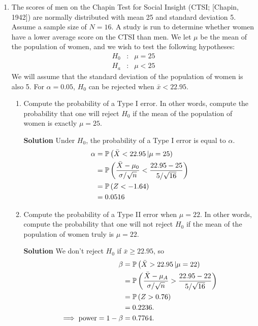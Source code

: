 \begin{enumerate}
    \item The scores of men on the Chapin Test for Social Insight (CTSI; [Chapin, 1942]) are normally distributed with mean 25 and standard deviation 5. Assume a sample size of $N = 16$. A study is run to determine whether women have a lower average score on the CTSI than men. We let $\mu$ be the mean of the population of women, and we wish to test the following hypotheses:
    \[
    \begin{matrix}
        H_0 & : & \mu=25 \\
        H_a & : & \mu<25
    \end{matrix}
    \]
    We will assume that the standard deviation of the population of women is also 5. For $\alpha = 0.05$, $H_0$ can be rejected when $\bar{x} < 22.95$.
    \begin{enumerate}
        \item Compute the probability of a Type I error. In other words, compute the probability that one will reject $H_0$ if the mean of the population of women is exactly $\mu = 25$.
        \begin{framed}{\textbf{Solution}}
        Under $H_0$, the probability of a Type I error is equal to $\alpha$.
        \begin{align}
            \alpha &= \operatorname{\mathbb{P}}{\left( \bar{X}<22.95 \left| \mu=25 \right) \right. }\\
            &= \operatorname{\mathbb{P}}{\left( \frac{\bar{X} - \mu_0}{\sigma/\sqrt{n}} < \frac{22.95 - 25}{5/\sqrt{16}}\right)} \\
            &= \operatorname{\mathbb{P}}{\left( Z<-1.64\right)} \\
            &= 0.0516
        \end{align}
        \end{framed}
        
        \item Compute the probability of a Type II error when $\mu = 22$. In other words, compute the probability that one will not reject $H_0$ if the mean of the population of women truly is $\mu = 22$.
        \begin{framed}{\textbf{Solution}}
        We don't reject $H_0$ if $\bar{x}\geq 22.95$, so
        \begin{align}
            \beta &= \operatorname{\mathbb{P}}{\left( \bar{X}>22.95 \left| \mu=22 \right) \right. } \\
            &= \operatorname{\mathbb{P}}{\left( \frac{\bar{X} - \mu_A}{\sigma/\sqrt{n}} > \frac{22.95 - 22}{5/\sqrt{16}}\right)} \\
            &= \operatorname{\mathbb{P}}{\left( Z>0.76\right)} \\
            &= 0.2236. \\
            \implies \text{power} = 1 - \beta &= 0.7764.
        \end{align}
        \end{framed}
        

\end{enumerate}
\end{enumerate}
